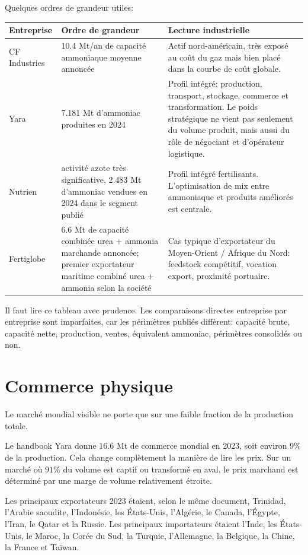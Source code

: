 \documentclass[11pt]{article}
\begin{document}
Quelques ordres de grandeur utiles:

\begin{center}
\begin{tabular}{p{3.1cm} p{3.2cm} p{8.2cm}}
\toprule
Entreprise & Ordre de grandeur & Lecture industrielle \\
\midrule
CF Industries & 10.4 Mt/an de capacité ammoniaque moyenne annoncée & Actif nord-américain, très exposé au coût du gaz mais bien placé dans la courbe de coût globale. \\
Yara & 7.181 Mt d'ammoniac produites en 2024 & Profil intégré: production, transport, stockage, commerce et transformation. Le poids stratégique ne vient pas seulement du volume produit, mais aussi du rôle de négociant et d'opérateur logistique. \\
Nutrien & activité azote très significative, 2.483 Mt d'ammoniac vendues en 2024 dans le segment publié & Profil intégré fertilisants. L'optimisation de mix entre ammoniaque et produits améliorés est centrale. \\
Fertiglobe & 6.6 Mt de capacité combinée urea + ammonia marchande annoncée; premier exportateur maritime combiné urea + ammonia selon la société & Cas typique d'exportateur du Moyen-Orient / Afrique du Nord: feedstock compétitif, vocation export, proximité portuaire. \\
\bottomrule
\end{tabular}
\end{center}

Il faut lire ce tableau avec prudence. Les comparaisons directes entreprise par entreprise sont imparfaites, car les périmètres publiés diffèrent: capacité brute, capacité nette, production, ventes, équivalent ammoniac, périmètres consolidés ou non.

\section{Commerce physique}

Le marché mondial visible ne porte que sur une faible fraction de la production totale.

Le handbook Yara donne \(16.6\) Mt de commerce mondial en 2023, soit environ \(9\%\) de la production. Cela change complètement la manière de lire les prix. Sur un marché où \(91\%\) du volume est captif ou transformé en aval, le prix marchand est déterminé par une marge de volume relativement étroite.

Les principaux exportateurs 2023 étaient, selon le même document, Trinidad, l'Arabie saoudite, l'Indonésie, les États-Unis, l'Algérie, le Canada, l'Égypte, l'Iran, le Qatar et la Russie. Les principaux importateurs étaient l'Inde, les États-Unis, le Maroc, la Corée du Sud, la Turquie, l'Allemagne, la Belgique, la Chine, la France et Taïwan.
\end{document}
